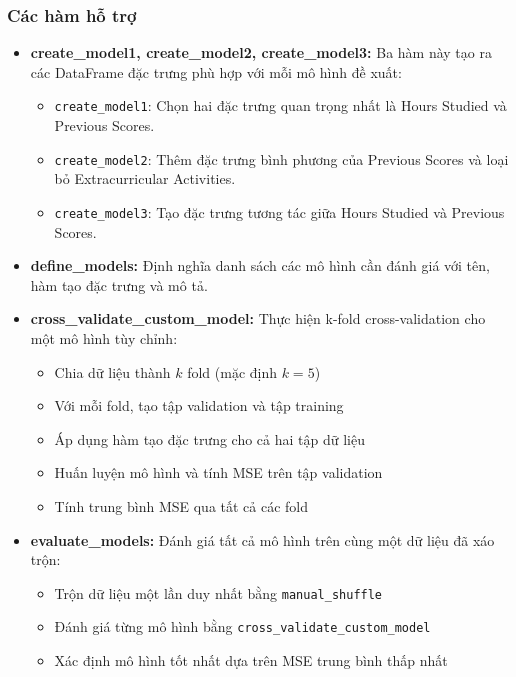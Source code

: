 \subsubsection{Các hàm hỗ trợ}

\begin{itemize}
	\item \textbf{create\_model1, create\_model2, create\_model3:} Ba hàm này tạo ra các DataFrame đặc trưng phù hợp với mỗi mô hình đề xuất:
	      \begin{itemize}
		      \item \texttt{create\_model1}: Chọn hai đặc trưng quan trọng nhất là Hours Studied và Previous Scores.
		      \item \texttt{create\_model2}: Thêm đặc trưng bình phương của Previous Scores và loại bỏ Extracurricular Activities.
		      \item \texttt{create\_model3}: Tạo đặc trưng tương tác giữa Hours Studied và Previous Scores.
	      \end{itemize}

	\item \textbf{define\_models:} Định nghĩa danh sách các mô hình cần đánh giá với tên, hàm tạo đặc trưng và mô tả.

	\item \textbf{cross\_validate\_custom\_model:} Thực hiện k-fold cross-validation cho một mô hình tùy chỉnh:
	      \begin{itemize}
		      \item Chia dữ liệu thành $k$ fold (mặc định $k=5$)
		      \item Với mỗi fold, tạo tập validation và tập training
		      \item Áp dụng hàm tạo đặc trưng cho cả hai tập dữ liệu
		      \item Huấn luyện mô hình và tính MSE trên tập validation
		      \item Tính trung bình MSE qua tất cả các fold
	      \end{itemize}

	\item \textbf{evaluate\_models:} Đánh giá tất cả mô hình trên cùng một dữ liệu đã xáo trộn:
	      \begin{itemize}
		      \item Trộn dữ liệu một lần duy nhất bằng \texttt{manual\_shuffle}
		      \item Đánh giá từng mô hình bằng \texttt{cross\_validate\_custom\_model}
		      \item Xác định mô hình tốt nhất dựa trên MSE trung bình thấp nhất
	      \end{itemize}


\end{itemize}
